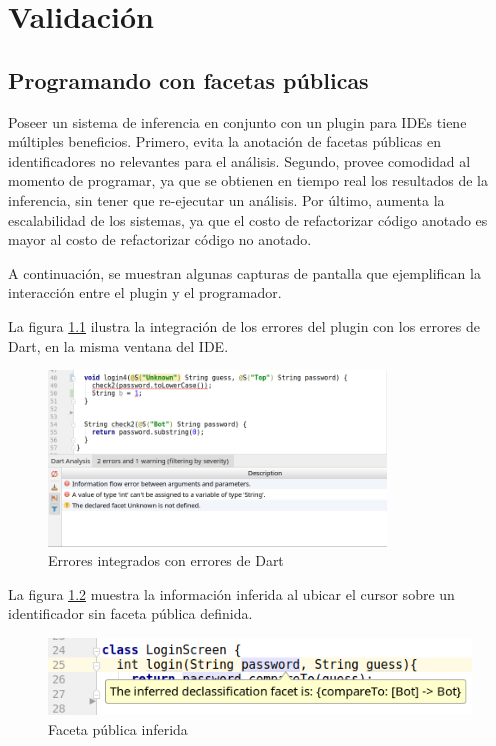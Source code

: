 \chapter{Validación}

\section{Programando con facetas públicas}
Poseer un sistema de inferencia en conjunto con un plugin para IDEs tiene múltiples beneficios. Primero, evita la anotación de facetas públicas en identificadores no relevantes para el análisis. Segundo, provee comodidad al momento de programar, ya que se obtienen en tiempo real los resultados de la inferencia, sin tener que re-ejecutar un análisis. Por último, aumenta la escalabilidad de los sistemas, ya que el costo de refactorizar código anotado es mayor al costo de refactorizar código no anotado.

A continuación, se muestran algunas capturas de pantalla que ejemplifican la interacción entre el plugin y el programador.

La figura \ref{screen1} ilustra la integración de los errores del plugin con los errores de Dart, en la misma ventana del IDE.

\begin{figure}[ht]
  \centering
  \includegraphics[width=0.8\textwidth]{imagenes/screen1.png}
  \caption{Errores integrados con errores de Dart}
  \label{screen1}
\end{figure}
\clearpage

La figura \ref{screen2} muestra la información inferida al ubicar el cursor sobre un identificador sin faceta pública definida.

\begin{figure}[ht]
  \includegraphics[width=\textwidth]{imagenes/screen2.png}
  \caption{Faceta pública inferida}
  \label{screen2}
\end{figure}


